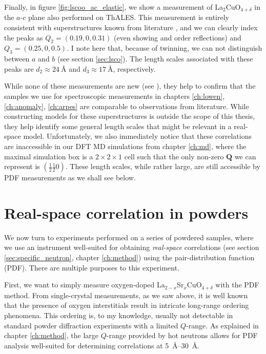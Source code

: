 Finally, in figure \ref{fig:lscoo_ac_elastic}, we show a measurement of La$_2$CuO$_{4+\delta}$ in the $a$-$c$ plane also performed on ThALES. This measurement is entirely consistent with superstructures known from literature \cite{Kusmartsev2000}, and we can clearly index the peaks as $Q_2 = (0.19, 0, 0.31)$ (even showing  and  order reflections) and $Q_3 = (0.25,0,0.5)$. I note here that, because of twinning, we can not distinguish between $a$ and $b$ (see section \ref{sec:lsco}). The length scales associated with these peaks are $d_2 \approx \SI{24}{\angstrom}$ and $d_3 \approx \SI{17}{\angstrom}$, respectively.

While none of these measurements are new (see \cite[Chapter 10]{Ray2016}), they help to confirm that the samples we use for spectroscopic measurements in chapters \ref{ch:lowen}, \ref{ch:anomaly}, \ref{ch:arpes} are comparable to observations from literature. While constructing models for these superstructures is outside the scope of this thesis, they help identify some general length scales that might be relevant in a real-space model. Unfortunately, we also immediately notice that these correlations are inaccessible in our DFT MD simulations from chapter \ref{ch:md}, where the maximal simulation box is a $2 \times 2 \times 1$ cell such that the only non-zero $\bm{Q}$ we can represent is $(\frac{1}{2}\frac{1}{2}{0})$. These length scales, while rather large, are still accessible by PDF measurements as we shall see below.

\section{Real-space correlation in powders}
We now turn to experiments performed on a series of powdered samples, where we use an instrument well-suited for obtaining \emph{real-space} correlations (see section \ref{sec:specific_neutron}, chapter \ref{ch:method}) using the pair-distribution function (PDF). There are multiple purposes to this experiment. 

First, we want to simply measure oxygen-doped La$_{2-x}$Sr$_x$CuO$_{4+\delta}$ with the PDF method. From single-crystal measurements, as we saw above, it is well known that the presence of oxygen interstitials result in intricate long-range ordering phenomena. This ordering is, to my knowledge, usually not detectable in standard powder diffraction experiments with a limited $Q$-range. As explained in chapter \ref{ch:method}, the large $Q$-range provided by hot neutrons allows for PDF analysis well-suited for determining correlations at \SIrange{5}{30}{\angstrom}.

